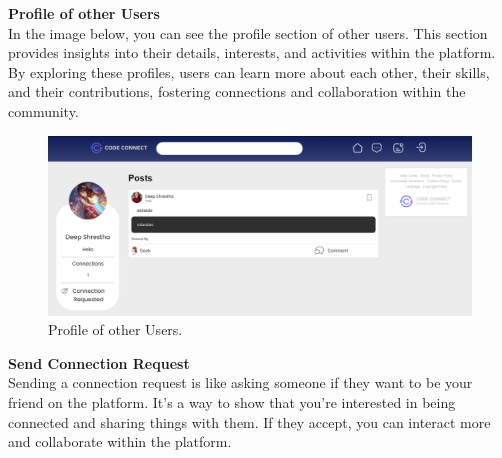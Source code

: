 \textbf{Profile of other Users}
\\In the image below, you can see the profile section of other users. This section provides insights into their details, interests, and activities within the platform. By exploring these profiles, users can learn more about each other, their skills, and their contributions, fostering connections and collaboration within the community.
\begin{figure}[ht]
    \centering
    \includegraphics[width=1\textwidth]{Outcome-ss/other-user-profile.png}
    \caption{Profile of other Users.}
    \label{fig:Profile of other Users}
\end{figure}
\newpage
\textbf{Send Connection Request}
\\Sending a connection request is like asking someone if they want to be your friend on the platform. It's a way to show that you're interested in being connected and sharing things with them. If they accept, you can interact more and collaborate within the platform.
